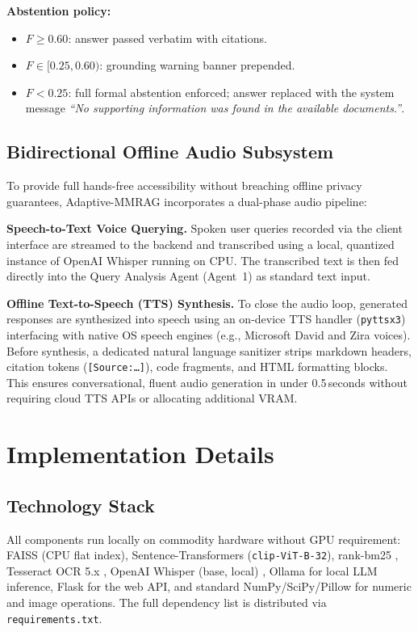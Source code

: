 \documentclass[conference]{IEEEtran}
\begin{document}
\textbf{Abstention policy:}
\begin{itemize}
  \item $F \geq 0.60$: answer passed verbatim with citations.
  \item $F \in [0.25, 0.60)$: grounding warning banner prepended.
  \item $F < 0.25$: full formal abstention enforced; answer replaced with
        the system message \textit{``No supporting information was found in
        the available documents.''}.
\end{itemize}

\subsection{Bidirectional Offline Audio Subsystem}
\label{subsec:audio_subsystem}

To provide full hands-free accessibility without breaching offline privacy
guarantees, Adaptive-MMRAG incorporates a dual-phase audio pipeline:

\textbf{Speech-to-Text Voice Querying.} Spoken user queries recorded via the
client interface are streamed to the backend and transcribed using a local,
quantized instance of OpenAI Whisper \cite{radford2023whisper} running on CPU.
The transcribed text is then fed directly into the Query Analysis Agent
(Agent~1) as standard text input.

\textbf{Offline Text-to-Speech (TTS) Synthesis.} To close the audio loop,
generated responses are synthesized into speech using an on-device TTS handler
(\texttt{pyttsx3}) interfacing with native OS speech engines (e.g., Microsoft
David and Zira voices). Before synthesis, a dedicated natural language
sanitizer strips markdown headers, citation tokens (\texttt{[Source:\dots]}),
code fragments, and HTML formatting blocks. This ensures conversational,
fluent audio generation in under 0.5\,seconds without requiring cloud TTS
APIs or allocating additional VRAM.

\section{Implementation Details}\label{sec:implementation}

\subsection{Technology Stack}
All components run locally on commodity hardware without GPU requirement:
FAISS \cite{johnson2019billion} (CPU flat index), Sentence-Transformers
\cite{reimers2019sentence} (\texttt{clip-ViT-B-32}), rank-bm25
\cite{rankbm25}, Tesseract OCR 5.x \cite{smith2007tesseract}, OpenAI Whisper
(base, local) \cite{radford2023whisper}, Ollama \cite{ollama2023} for local
LLM inference, Flask for the web API, and standard NumPy/SciPy/Pillow for
numeric and image operations. The full dependency list is distributed via
\texttt{requirements.txt}.
\end{document}
